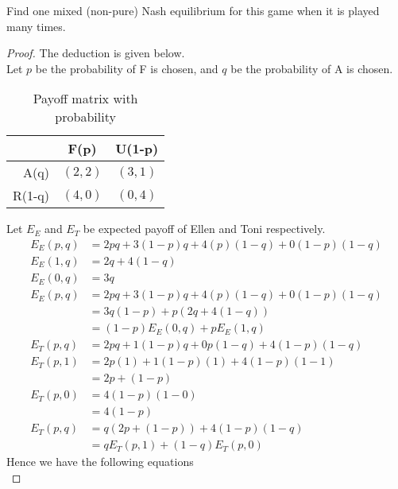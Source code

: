 \documentclass[12pt]{article}
\newenvironment{question}[2][Question]{\begin{trivlist}
\item[\hskip \labelsep {\bfseries #1}\hskip \labelsep {\bfseries #2.}]}{\end{trivlist}}
\begin{document}
\begin{question}{1c}
	Find one mixed (non-pure) Nash equilibrium for this game when it is played many times.
\end{question}
\begin{proof}
	The deduction is given below. \\
	Let $p$ be the probability of F is chosen, and $q$ be the probability of A is chosen. \\
	\begin{table}[h!]
		\begin{center}
			\caption{Payoff matrix with probability}
			\label{tab:table2}
			\begin{tabular}{r|c|c} %

				       & F(p)    & U(1-p)  \\
				\hline
				A(q)   & $(2,2)$ & $(3,1)$ \\
				R(1-q) & $(4,0)$ & $(0,4)$ \\
			\end{tabular}
		\end{center}
	\end{table}
	Let $E_E$ and $E_T$ be expected payoff of Ellen and Toni respectively.
	\begin{align*}
		E_E(p,q) & = 2pq+3(1-p)q+4(p)(1-q)+0(1-p)(1-q) \\
		E_E(1,q) & = 2q+4(1-q)                         \\
		E_E(0,q) & = 3q                                \\
		E_E(p,q) & = 2pq+3(1-p)q+4(p)(1-q)+0(1-p)(1-q) \\
		         & = 3q(1-p)+p(2q+4(1-q))              \\
		         & = (1-p)E_E(0,q)+pE_E(1,q)           \\
		E_T(p,q) & = 2pq+1(1-p)q+0p(1-q)+4(1-p)(1-q)   \\
		E_T(p,1) & = 2p(1)+1(1-p)(1)+4(1-p)(1-1)       \\
		         & = 2p+(1-p)                          \\
		E_T(p,0) & = 4(1-p)(1-0)                       \\
		         & = 4(1-p)                            \\
		E_T(p,q) & = q(2p+(1-p)) + 4(1-p)(1-q)         \\
		         & = qE_T(p,1) + (1-q)E_T(p,0)
	\end{align*}
	Hence we have the following equations \\

\end{proof}
\end{document}
